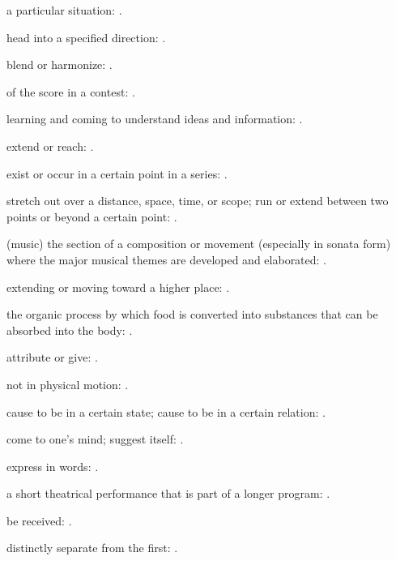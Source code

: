   a particular situation:   .

  head into a specified direction:   .

  blend or harmonize:   .

  of the score in a contest:   .

  learning and coming to understand ideas and information: .

  extend or reach: .

  exist or occur in a certain point in a series: .

  stretch out over a distance, space, time, or scope; run or extend between two points or beyond a certain point:   .

  (music) the section of a composition or movement (especially in sonata form) where the major musical themes are developed and elaborated: .

  extending or moving toward a higher place:   .

  the organic process by which food is converted into substances that can be absorbed into the body: .

  attribute or give:   .

  not in physical motion:   .

  cause to be in a certain state; cause to be in a certain relation: .

  come to one's mind; suggest itself:   .

  express in words:   .

  a short theatrical performance that is part of a longer program:   .

  be received:   .

  distinctly separate from the first: .

